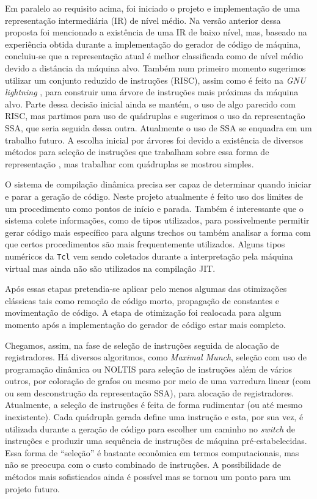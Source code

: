 Em paralelo ao requisito acima, foi iniciado o projeto e
implementação de uma representação intermediária (IR) de nível
médio. Na versão anterior dessa proposta foi mencionado a existência
de uma IR de baixo nível, mas, baseado na experiência obtida durante a
implementação do gerador de código de máquina, concluiu-se que a
representação atual é melhor classificada como de nível médio
devido a distância da máquina alvo. Também num primeiro momento
sugerimos utilizar um conjunto reduzido de instruções (RISC), assim
como é feito na \textit{GNU lightning} \cite{gnu_lightning}, para
construir uma árvore de instruções mais próximas da máquina
alvo. Parte dessa decisão inicial ainda se mantém, o uso de algo
parecido com RISC, mas partimos para uso de quádruplas e sugerimos o
uso da representação SSA, que seria seguida dessa outra. Atualmente o
uso de SSA se enquadra em um trabalho futuro.
A escolha inicial por árvores foi devido
a existência de diversos métodos para seleção de
instruções que trabalham sobre essa forma de representação
\cite{ir_tree_parsing}, mas trabalhar com quádruplas se mostrou
simples.

O sistema de compilação dinâmica precisa ser
capaz de determinar quando iniciar e parar a geração de código.
Neste projeto atualmente é feito uso dos
limites de um procedimento como pontos de início e parada. Também é
interessante que o sistema colete informações, como de tipos
utilizados, para possivelmente permitir gerar código mais específico
para alguns trechos ou também analisar a forma com que certos procedimentos
são mais frequentemente utilizados. Alguns tipos numéricos da
\texttt{Tcl} vem sendo coletados durante a interpretação pela máquina
virtual mas ainda não são utilizados na compilação JIT.

Após essas etapas pretendia-se aplicar pelo menos algumas das
otimizações clássicas tais como remoção de código morto, propagação de
constantes e movimentação de código. A etapa de otimização foi
realocada para algum momento após a implementação do gerador de código
estar mais completo.

Chegamos, assim, na fase de seleção de instruções
seguida de alocação de registradores. Há diversos algoritmos, como
\textit{Maximal Munch}, seleção com uso de programação dinâmica ou
NOLTIS \cite{noltis}  para seleção de instruções além de vários
outros, por coloração de grafos ou mesmo por meio de uma varredura
linear \cite{linear_scan_regalloc} (com ou sem \cite{wimmer_franz}
desconstrução da representação SSA), para alocação de registradores.
Atualmente, a seleção de instruções é feita de forma
rudimentar (ou até mesmo inexistente). Cada quádrupla gerada define uma
instrução e esta, por sua vez, é utilizada durante a geração de código
para escolher um caminho no \textit{switch} de instruções e produzir
uma sequência de instruções de máquina pré-estabelecidas. Essa forma
de ``seleção'' é bastante econômica em termos computacionais, mas não
se preocupa com o custo combinado de instruções. %
A possibilidade de métodos mais sofisticados ainda é
possível mas se tornou um ponto para um projeto futuro.

